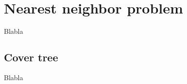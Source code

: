 \section{Nearest neighbor problem}\label{nearestNeighborProblem}
	Blabla

\subsection{Cover tree}
	Blabla